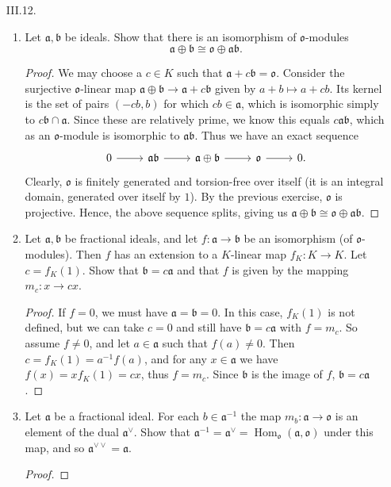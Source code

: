 \documentclass[10pt]{article}
\renewcommand{\a}{\mathfrak{a}}
\renewcommand{\b}{\mathfrak{b}}
\renewcommand{\o}{\mathfrak{o}}
\DeclareMathOperator*{\Hom}{Hom}
\begin{document}
\begin{enumerate}
\item[III.12.]
\begin{enumerate}
\item Let $\a,\b$ be ideals.  Show that there is an isomorphism of $\o$-modules
$$
\a \oplus \b \cong \o \oplus \a\b.
$$

\begin{proof}
We may choose a $c \in K$ such that $\a + c\b = \o$.  Consider the surjective $\o$-linear map $\a \oplus \b \rightarrow \a + c\b$ given by $a+b \mapsto a + cb$.  Its kernel is the set of pairs $(-cb,b)$ for which $cb \in \a$, which is isomorphic simply to $c\b \cap \a$.  Since these are relatively prime, we know this equals $c \a\b$, which as an $\o$-module is isomorphic to $\a\b$.  Thus we have an exact sequence
$$
\begin{tikzcd}
0 \arrow[r] & \a\b \arrow[r] & \a \oplus \b \arrow[r] & \o \arrow[r] & 0.
\end{tikzcd}
$$
Clearly, $\o$ is finitely generated and torsion-free over itself (it is an integral domain, generated over itself by $1$).  By the previous exercise, $\o$ is projective.  Hence, the above sequence splits, giving us $\a \oplus \b \cong \o \oplus \a\b$.
\end{proof}

\item Let $\a,\b$ be fractional ideals, and let $f:\a \rightarrow \b$ be an isomorphism (of $\o$-modules).  Then $f$ has an extension to a $K$-linear map $f_K:K \rightarrow K$.  Let $c = f_K(1)$.  Show that $\b = c\a$ and that $f$ is given by the mapping $m_c: x \rightarrow cx$.

\begin{proof}

If $f = 0$, we must have $\a=\b=0$.  In this case, $f_K(1)$ is not defined, but we can take $c=0$ and still have $\b = c\a$ with $f = m_c$.  So assume $f\neq 0$, and let $a \in \a$ such that $f(a) \neq 0$.  Then $c=f_K(1) = a^{-1}f(a)$, and for any $x \in \a$ we have $f(x) = xf_K(1) = cx$, thus $f = m_c$.  Since $\b$ is the image of $f$, $\b = c\a$.

\end{proof}

\item Let $\a$ be a fractional ideal.  For each $b \in \a^{-1}$ the map $m_b:\a \rightarrow \o$ is an element of the dual $\a^{\vee}$.  Show that $\a^{-1} = \a^\vee = \Hom_\o (\a,\o)$ under this map, and so $\a^{\vee \vee} = \a$.

\begin{proof}


\end{proof}
\end{enumerate}
\end{enumerate}
\end{document}
